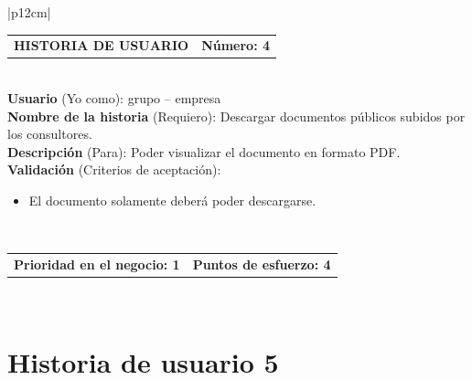 \documentclass[11pt,letterpaper]{report}
\begin{document}
	\begin{center}	
		\begin{tabular}{|p{12cm}|}
			\hline
			\begin{tabular}{c|c}
				\textbf{HISTORIA DE USUARIO} & \textbf{Número: 4} \\
			\end{tabular} \\ \hline
			\textbf{Usuario} (Yo como): grupo – empresa \\ \hline
			\textbf{Nombre de la historia} (Requiero): Descargar documentos públicos subidos por los consultores. \\ \hline
			\textbf{Descripción} (Para): Poder visualizar el documento en formato PDF. \\ \hline
			\textbf{Validación} (Criterios de aceptación): \\
			\begin{minipage}{12cm}
				\begin{itemize}
					\item El documento solamente deberá poder descargarse.
				\end{itemize}
			\end{minipage} \\ \hline
			\begin{tabular}{c|c}
				\textbf{Prioridad en el negocio: 1} & \textbf{Puntos de esfuerzo: 4} \\
			\end{tabular} \\ \hline
		\end{tabular}
	\end{center}
	
	\section{Historia de usuario 5}	
	
\end{document}
